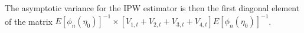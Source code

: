 \documentclass[11pt]{amsart}
\numberwithin{equation}{section}
\theoremstyle{plain}
\begin{document}
The asymptotic variance for the IPW estimator is then the first diagonal element of the matrix $E \left[ \phi_n (\eta_0) \right]^{-1} \times \left[ V_{1,t} + V_{2,t} + V_{3,t} + V_{4,t} \right] E \left[ \phi_n (\eta_0) \right]^{-1}$.



\end{document}
